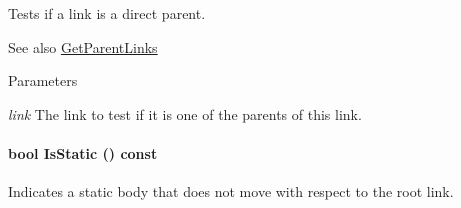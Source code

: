 Tests if a link is a direct parent. 

\begin{DoxySeeAlso}{See also}
\hyperlink{classOpenRAVE_1_1KinBody_1_1Link_a975b50117973af79adde0411409e1cea}{GetParentLinks} 
\end{DoxySeeAlso}

\begin{DoxyParams}{Parameters}
\item[{\em link}]The link to test if it is one of the parents of this link. \end{DoxyParams}
\hypertarget{classOpenRAVE_1_1KinBody_1_1Link_a3578d5b29398025138bfed3ef1e99558}{
\paragraph[{IsStatic}]{\setlength{\rightskip}{0pt plus 5cm}bool IsStatic () const}\hfill}
\label{classOpenRAVE_1_1KinBody_1_1Link_a3578d5b29398025138bfed3ef1e99558}


Indicates a static body that does not move with respect to the root link. 

